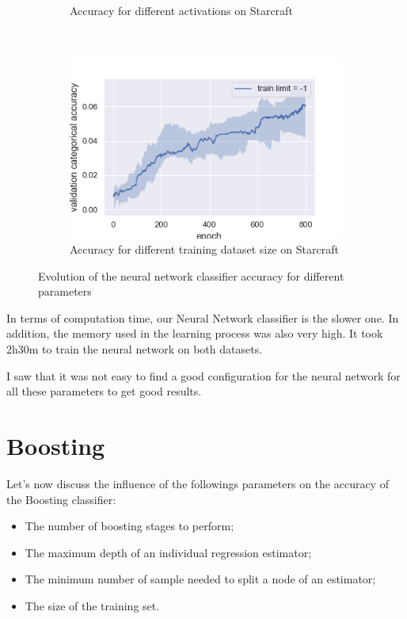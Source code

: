 \documentclass[10pt]{article}
\begin{document}
\begin{figure}
\begin{subfigure}[]{0.45\columnwidth}
				\caption{Accuracy for different activations on Starcraft}
				\label{per_sc_act}
			\end{subfigure}~
				\begin{subfigure}[]{0.45\columnwidth}
				\centering
				\includegraphics[width=\linewidth]{../graphics/per_starcraft_epoch_score_type_train_limit.png}
				\caption{Accuracy for different training dataset size on Starcraft}
				\label{per_sc_tl}
			\end{subfigure}
			\caption{Evolution of the neural network classifier accuracy for different parameters}
			\label{per}
		\end{figure}

		In terms of computation time, our Neural Network classifier is the slower one. In addition, the memory used in the learning process was also very high. It took 2h30m to train the neural network on both datasets.

		I saw that it was not easy to find a good configuration for the neural network for all these parameters to get good results.
	\section{Boosting}
		Let's now discuss the influence of the followings parameters on the accuracy of the Boosting classifier:
		\begin{itemize}
			\item The number of boosting stages to perform;
			\item The maximum depth of an individual regression estimator;
			\item The minimum number of sample needed to split a node of an estimator;
			\item The size of the training set.
		\end{itemize}
\end{document}
